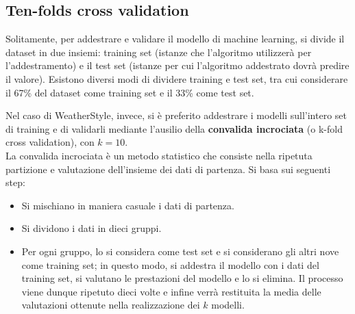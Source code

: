 \documentclass[a4paper, 11pt, oneside]{report}
\begin{document}
                \subsection{Ten-folds cross validation}
                Solitamente, per addestrare e validare il modello di machine learning, si divide il dataset in due insiemi: training
                set (istanze che l'algoritmo utilizzerà per l'addestramento) e il test set (istanze per cui l'algoritmo
                addestrato dovrà predire il valore). Esistono diversi modi di dividere training e test set, tra cui
                considerare il 67\% del dataset come training set e il 33\% come test set.
                \\
                \par \noindent Nel caso di WeatherStyle, invece, si è preferito addestrare i modelli sull'intero set di
                training e di validarli mediante l'ausilio della \textbf{convalida incrociata} (o k-fold cross validation), con $k=10$.
                \\ \noindent La convalida incrociata è un metodo statistico che consiste nella ripetuta partizione e
                valutazione dell'insieme dei dati di partenza. Si basa sui seguenti step:
                \begin{itemize}
                    \item Si mischiano in maniera casuale i dati di partenza.
                    \item Si dividono i dati in dieci gruppi.
                    \item Per ogni gruppo, lo si considera come test set e si considerano gli altri nove come training set;
                    in questo modo, si addestra il modello con i dati del training set, si valutano le prestazioni del modello
                    e lo si elimina. Il processo viene dunque ripetuto dieci volte e infine verrà restituita la media delle
                    valutazioni ottenute nella realizzazione dei $k$ modelli.
                \end{itemize}
\end{document}
